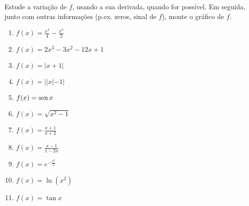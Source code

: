 \begin{exo}\label{Ex:variacoesbasicas}
Estude a variação de $f$, usando a sua derivada, quando for possível.
Em seguida, junto com outras informações (p.ex. zeros, sinal de $f$), 
monte o gráfico de $f$.
\begin{multicols}{3}
\begin{enumerate}
\item\label{itestudfunceleme2} $f(x)=\frac{x^4}{4}-\frac{x^2}{2}$
\item\label{itestudfunceleme21} $f(x)=\scriptstyle{2x^3-3x^2-12x+1}$
\item\label{itestudfunceleme22} $f(x)=|x+1|$
\item\label{itestudfunceleme3} $f(x)=||x|-1|$
\item\label{itestudfunceleme4} $f(x)=\operatorname{sen} x$
\item\label{itestudfunceleme5} $f(x)=\sqrt{x^2-1}$ 
\item\label{itestudfunceleme6} $f(x)=\frac{x+1}{x+2}$
\item\label{itestudfunceleme61} $f(x)=\frac{x-1}{1-2x}$
\item\label{itestudfunceleme7} $f(x)=e^{-\frac{x^2}{2}}$
\item\label{itestudfunceleme9} $f(x)=\ln(x^2)$
\item\label{itestudfunceleme10} $f(x)=\tan x$
\end{enumerate}
\end{multicols}
\vspace{0.01cm}
\begin{sol}


\end{sol}
\end{exo}

